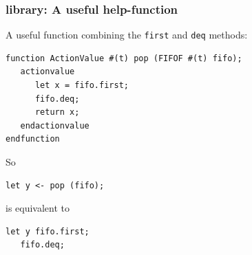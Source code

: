 \begin{frame}[fragile]
\frametitle{{\BSV} library: A useful help-function}

\footnotesize

A useful function combining the {\tt first} and {\tt deq} methods:
\begin{Verbatim}[frame=single]
function ActionValue #(t) pop (FIFOF #(t) fifo);
   actionvalue
      let x = fifo.first;
      fifo.deq;
      return x;
   endactionvalue
endfunction
\end{Verbatim}

\vspace{4ex}

\begin{center}
So \hmm
\begin{minipage}{0.3\textwidth}
\begin{Verbatim}[frame=single]
   let y <- pop (fifo);
\end{Verbatim}
\end{minipage}
\hmm is equivalent to \hmm
\begin{minipage}{0.3\textwidth}
\begin{Verbatim}[frame=single]
   let y fifo.first;
   fifo.deq;
\end{Verbatim}
\end{minipage}
\end{center}

\end{frame}



